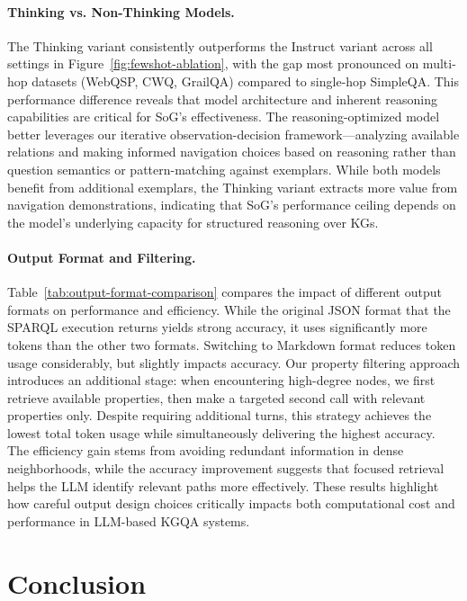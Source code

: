 \documentclass[sigconf]{acmart}
\begin{document}
\begin{sloppypar}
\paragraph{Thinking vs. Non-Thinking Models.}
The Thinking variant consistently outperforms the Instruct variant across all settings in Figure~\ref{fig:fewshot-ablation}, with the gap most pronounced on multi-hop datasets (WebQSP, CWQ, GrailQA) compared to single-hop SimpleQA. This performance difference reveals that model architecture and inherent reasoning capabilities are critical for SoG's effectiveness. The reasoning-optimized model better leverages our iterative observation-decision framework---analyzing available relations and making informed navigation choices based on reasoning rather than question semantics or pattern-matching against exemplars. While both models benefit from additional exemplars, the Thinking variant extracts more value from navigation demonstrations, indicating that SoG's performance ceiling depends on the model's underlying capacity for structured reasoning over KGs.  
\end{sloppypar}




\paragraph{Output Format and Filtering.}
Table~\ref{tab:output-format-comparison} compares the impact of different output formats on performance and efficiency. While the original JSON format that the SPARQL execution returns yields strong accuracy, it uses significantly more tokens than the other two formats. Switching to Markdown format reduces token usage considerably, but slightly impacts accuracy. Our property filtering approach introduces an additional stage: when encountering high-degree nodes, we first retrieve available properties, then make a targeted second call with relevant properties only. Despite requiring additional turns, this strategy achieves the lowest total token usage while simultaneously delivering the highest accuracy. The efficiency gain stems from avoiding redundant information in dense neighborhoods, while the accuracy improvement suggests that focused retrieval helps the LLM identify relevant paths more effectively. These results highlight how careful output design choices critically impacts both computational cost and performance in LLM-based KGQA systems.

\section{Conclusion}
\end{document}
